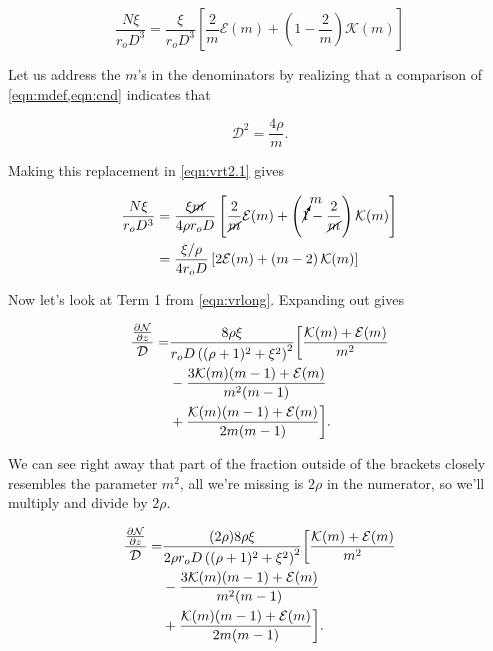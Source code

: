 \begin{equation}
    \label{eqn:vrt2.1}
    \frac{N\xi}{r_oD^3} =  \frac{\xi}{r_oD^3} \left[\frac{2}{m}\mathcal{E}(m) + \left(1-\frac{2}{m}\right)\mathcal{K}(m)\right]
\end{equation}

\noindent Let us address the \(m\)'s in the denominators by realizing that a comparison of \cref{eqn:mdef,eqn:cnd} indicates that

\begin{equation}
    \mathcal{D}^2 = \frac{4\rho}{m}.
\end{equation}

\noindent Making this replacement in \cref{eqn:vrt2.1} gives

\begin{equation}
    \label{eqn:term2simple}
    \begin{aligned}
        \frac{N\xi}{r_oD^3} &= \frac{\xi \cancel{m}}{4\rho r_o D} \left[ \frac{2}{\cancel{m}}\mathcal{E}(m) + \left(\cancelto{m}{1} - \frac{2}{\cancel{m}} \right)\mathcal{K}(m) \right] \\
        &= \frac{\xi/\rho }{4 r_o D} \left[ 2\mathcal{E}(m) + \left(m - 2 \right)\mathcal{K}(m) \right]
    \end{aligned}
\end{equation}

Now let's look at Term 1 from \cref{eqn:vrlong}.
%
Expanding out gives

\begin{equation}
    \begin{split}
        \frac{\frac{\partial \mathcal{N}}{\partial z}}{\mathcal{D}} =& \frac{8\rho \xi}{r_o D \left((\rho+1)^2 + \xi^2\right)^2} \bigg[ \frac{\mathcal{K}(m)+\mathcal{E}(m)}{m^2}\\
         &- \frac{3\mathcal{K}(m)(m-1)+\mathcal{E}(m)}{m^2(m-1)}\\
         &+ \frac{\mathcal{K}(m)(m-1)+\mathcal{E}(m)}{2m(m-1)} \bigg].
    \end{split}
\end{equation}

\noindent We can see right away that part of the fraction outside of the brackets closely resembles the parameter \(m^2\), all we're missing is \(2\rho\) in the numerator, so we'll multiply and divide by \(2 \rho\).

\begin{equation}
    \begin{split}
        \frac{\frac{\partial \mathcal{N}}{\partial z}}{\mathcal{D}} =& \frac{(2\rho)8\rho \xi}{2\rho r_o D \left((\rho+1)^2 + \xi^2\right)^2} \bigg[ \frac{\mathcal{K}(m)+\mathcal{E}(m)}{m^2}\\
         &- \frac{3\mathcal{K}(m)(m-1)+\mathcal{E}(m)}{m^2(m-1)}\\
         &+ \frac{\mathcal{K}(m)(m-1)+\mathcal{E}(m)}{2m(m-1)} \bigg].
    \end{split}
\end{equation}

